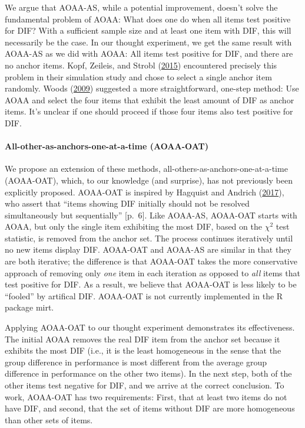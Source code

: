 \documentclass[
  11pt,
]{article}
\begin{document}
We argue that AOAA-AS, while a potential improvement, doesn't solve the fundamental problem of AOAA: What does one do when all items test positive for DIF? With a sufficient sample size and at least one item with DIF, this will necessarily be the case. In our thought experiment, we get the same result with AOAA-AS as we did with AOAA: All items test positive for DIF, and there are no anchor items. Kopf, Zeileis, and Strobl (\protect\hyperlink{ref-kopf2015framework}{2015}) encountered precisely this problem in their simulation study and chose to select a single anchor item randomly. Woods (\protect\hyperlink{ref-woods2009empirical}{2009}) suggested a more straightforward, one-step method: Use AOAA and select the four items that exhibit the least amount of DIF as anchor items. It's unclear if one should proceed if those four items also test positive for DIF.

\hypertarget{all-other-as-anchors-one-at-a-time-aoaa-oat}{%
\paragraph{All-other-as-anchors-one-at-a-time (AOAA-OAT)}\label{all-other-as-anchors-one-at-a-time-aoaa-oat}}

We propose an extension of these methods, all-others-as-anchors-one-at-a-time (AOAA-OAT), which, to our knowledge (and surprise), has not previously been explicitly proposed. AOAA-OAT is inspired by Hagquist and Andrich (\protect\hyperlink{ref-hagquist2017recent}{2017}), who assert that \enquote{items showing DIF initially should not be resolved simultaneously but sequentially} {[}p.~6{]}. Like AOAA-AS, AOAA-OAT starts with AOAA, but only the single item exhibiting the most DIF, based on the \(\chi^2\) test statistic, is removed from the anchor set. The process continues iteratively until no new items display DIF. AOAA-OAT and AOAA-AS are similar in that they are both iterative; the difference is that AOAA-OAT takes the more conservative approach of removing only \emph{one} item in each iteration as opposed to \emph{all} items that test positive for DIF. As a result, we believe that AOAA-OAT is less likely to be \enquote{fooled} by artifical DIF. AOAA-OAT is not currently implemented in the R package mirt.

Applying AOAA-OAT to our thought experiment demonstrates its effectiveness. The initial AOAA removes the real DIF item from the anchor set because it exhibits the most DIF (i.e., it is the least homogeneous in the sense that the group difference in performance is most different from the average group difference in performance on the other two items). In the next step, both of the other items test negative for DIF, and we arrive at the correct conclusion. To work, AOAA-OAT has two requirements: First, that at least two items do not have DIF, and second, that the set of items without DIF are more homogeneous than other sets of items.
\end{document}
